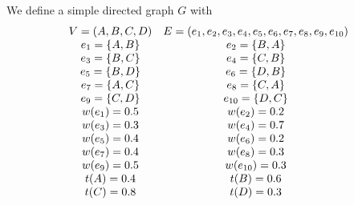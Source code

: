 We define a simple directed graph $G$ with\\
\begin{equation}
\begin{array}{c c}
V=(A,B,C,D) &
E=(e_{1},e_{2},e_{3},e_{4},e_{5},e_{6},e_{7},e_{8},e_{9},e_{10})\\
e_{1}=\{A,B\} & e_{2}=\{B,A\}\\
e_{3}=\{B,C\} & e_{4}=\{C,B\}\\
e_{5}=\{B,D\} & e_{6}=\{D,B\}\\
e_{7}=\{A,C\} & e_{8}=\{C,A\}\\
e_{9}=\{C,D\} & e_{10}=\{D,C\}\\ 
w(e_{1})=0.5 & w(e_{2})=0.2\\
w(e_{3})=0.3 & w(e_{4})=0.7\\
w(e_{5})=0.4 & w(e_{6})=0.2\\
w(e_{7})=0.4 & w(e_{8})=0.3\\
w(e_{9})=0.5 & w(e_{10})=0.3\\
t(A)=0.4 & t(B)=0.6\\
t(C)=0.8 & t(D)=0.3\\
\end{array} 
\end{equation}
